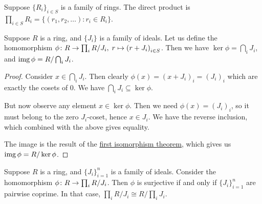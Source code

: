 \begin{definition}
    Suppose \({\{R_i\}}_{i \in S}\) is a family of rings.
    The direct product is \(\prod_{i \in S} R_i = \{(r_1,r_2,\hdots) : r_i \in R_i\}\).
\end{definition}
\begin{lemma}\label{lem:ideal-projections}
    Suppose \(R\) is a ring, and \(\{J_i\}\) is a family of ideals.
    Let us define the homomorphism \(\phi\colon R\to\prod_i R/J_i,\;r\mapsto{(r+J_i)}_{i \in S}\).
    Then we have \(\ker\phi = \bigcap_i J_i\),
    and \(\operatorname{img}\phi = R/\bigcap_i J_i\).
\end{lemma}
\begin{proof}
    Consider \(x \in \bigcap_i J_i\).
    Then clearly \(\phi(x) = {(x+J_i)}_i = {(J_i)}_i\)
    which are exactly the cosets of 0.
    We have \(\bigcap_i J_i \subseteq \ker\phi\).

    But now observe any element \(x \in \ker\phi\).
    Then we need \(\phi(x) = {(J_i)}_i\),
    so it must belong to the zero \(J_i\)-coset,
    hence \(x \in J_i\).
    We have the reverse inclusion,
    which combined with the above gives equality.

    The image is the result of the
    \hyperref[thm:iso-1-mod]{first isomorphism theorem},
    which gives us \(\operatorname{img}\phi = R/\ker\phi\).
\end{proof}
\begin{theorem}
    Suppose \(R\) is a ring, and \({\{J_i\}}_{i=1}^n\) is a family of ideals.
    Consider the homomorphism \(\phi\colon R\to\prod_i R/J_i\).
    Then \(\phi\) is surjective if and only if \({\{J_i\}}_{i=1}^n\) are pairwise coprime.
    In that case, \(\prod_i R/J_i \cong R/\prod_i J_i\).
\end{theorem}

